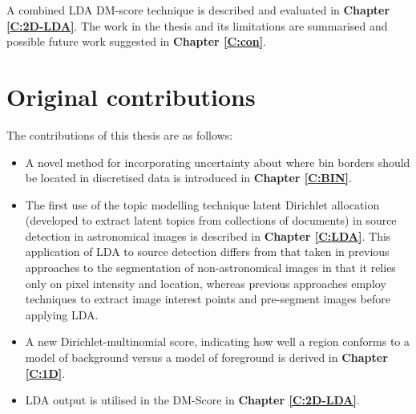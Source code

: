 A combined LDA DM-score technique is described and evaluated in \textbf{Chapter \ref{C:2D-LDA}}. The work in the thesis and its limitations are summarised and possible future work suggested in \textbf{Chapter \ref{C:con}}.

\section{Original contributions}

The contributions of this thesis are as follows:
\begin{itemize}
\item A novel method for incorporating uncertainty about where bin borders should be located in discretised data is introduced in \textbf{Chapter \ref{C:BIN}}.
\item The first use of the topic modelling technique latent Dirichlet allocation (developed to extract latent topics from collections of documents) in source detection in astronomical images is described in \textbf{Chapter \ref{C:LDA}}. This application of LDA to source detection differs from that taken in previous approaches to the segmentation of non-astronomical images in that it relies only on pixel intensity and location, whereas previous approaches employ techniques to extract image interest points and pre-segment images before applying LDA.
\item A new Dirichlet-multinomial score, indicating how well a region conforms to a model of background versus a model of foreground is derived in \textbf{Chapter \ref{C:1D}}.
\item LDA output is utilised in the DM-Score in \textbf{Chapter \ref{C:2D-LDA}}.
\end{itemize}
